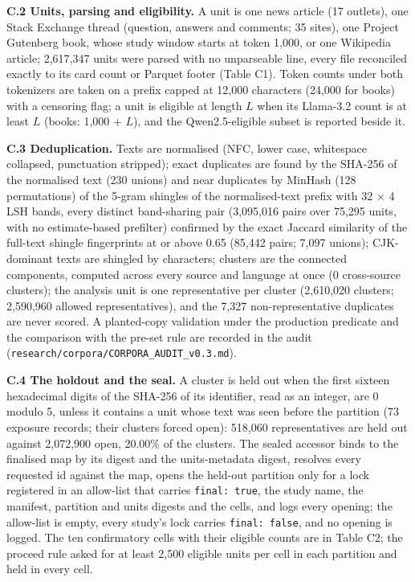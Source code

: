 \documentclass[11pt,letterpaper]{article}
\begin{document}
\textbf{C.2 Units, parsing and eligibility.} A unit is one news article (17 outlets), one Stack Exchange thread (question, answers and comments; 35 sites), one Project Gutenberg book, whose study window starts at token 1,000, or one Wikipedia article; 2,617,347 units were parsed with no unparseable line, every file reconciled exactly to its card count or Parquet footer (Table C1). Token counts under both tokenizers are taken on a prefix capped at 12,000 characters (24,000 for books) with a censoring flag; a unit is eligible at length \(L\) when its Llama-3.2 count is at least \(L\) (books: 1,000 + \(L\)), and the Qwen2.5-eligible subset is reported beside it.

\textbf{C.3 Deduplication.} Texts are normalised (NFC, lower case, whitespace collapsed, punctuation stripped); exact duplicates are found by the SHA-256 of the normalised text (230 unions) and near duplicates by MinHash (128 permutations) of the 5-gram shingles of the normalised-text prefix with 32 \ensuremath{\times} 4 LSH bands, every distinct band-sharing pair (3,095,016 pairs over 75,295 units, with no estimate-based prefilter) confirmed by the exact Jaccard similarity of the full-text shingle fingerprints at or above 0.65 (85,442 pairs; 7,097 unions); CJK-dominant texts are shingled by characters; clusters are the connected components, computed across every source and language at once (0 cross-source clusters); the analysis unit is one representative per cluster (2,610,020 clusters; 2,590,960 allowed representatives), and the 7,327 non-representative duplicates are never scored. A planted-copy validation under the production predicate and the comparison with the pre-set rule are recorded in the audit (\texttt{research/\allowbreak{}corpora/\allowbreak{}CORPORA\_\allowbreak{}AUDIT\_\allowbreak{}v0.\allowbreak{}3.\allowbreak{}md}).

\textbf{C.4 The holdout and the seal.} A cluster is held out when the first sixteen hexadecimal digits of the SHA-256 of its identifier, read as an integer, are 0 modulo 5, unless it contains a unit whose text was seen before the partition (73 exposure records; their clusters forced open): 518,060 representatives are held out against 2,072,900 open, 20.00\% of the clusters. The sealed accessor binds to the finalised map by its digest and the units-metadata digest, resolves every requested id against the map, opens the held-out partition only for a lock registered in an allow-list that carries \texttt{final:\ true}, the study name, the manifest, partition and units digests and the cells, and logs every opening; the allow-list is empty, every study's lock carries \texttt{final:\ false}, and no opening is logged. The ten confirmatory cells with their eligible counts are in Table C2; the proceed rule asked for at least 2,500 eligible units per cell in each partition and held in every cell.
\end{document}
